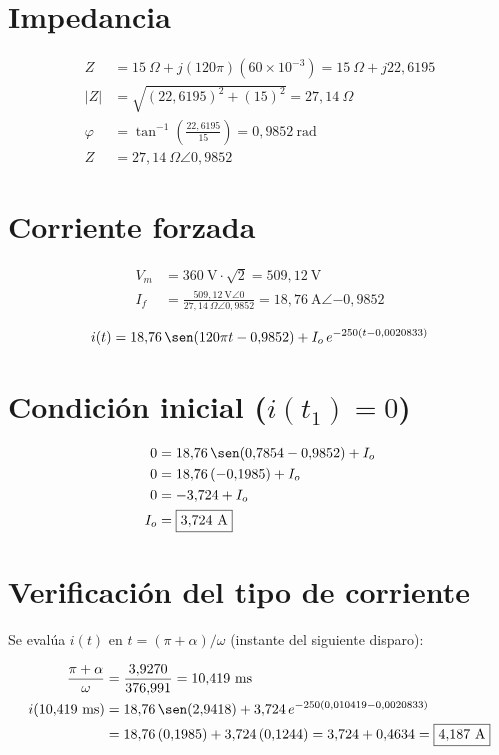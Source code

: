 \documentclass[11pt]{article}
\begin{document}
\section*{Impedancia}

\begin{align*}
Z &= 15\ \Omega + j(120\pi)(60\times10^{-3}) = 15\ \Omega + j22{,}6195 \\
|Z| &= \sqrt{(22{,}6195)^2+(15)^2} = 27{,}14\ \Omega \\
\varphi &= \tan^{-1}\!\left(\frac{22{,}6195}{15}\right) = 0{,}9852\ \text{rad} \\
Z &= 27{,}14\ \Omega \angle 0{,}9852
\end{align*}

\section*{Corriente forzada}

\begin{align*}
V_m &= 360\ \text{V}\cdot\sqrt{2} = 509{,}12\ \text{V} \\
I_f &= \frac{509{,}12\ \text{V}\angle 0}{27{,}14\ \Omega\angle 0{,}9852} = 18{,}76\ \text{A}\angle{-0{,}9852}
\end{align*}

\begin{align*}
i(t) = 18{,}76\,\sen(120\pi t - 0{,}9852) + I_o\,e^{-250(t-0{,}0020833)}
\end{align*}

\section*{Condici\'on inicial ($i(t_1)=0$)}

\begin{align*}
0 &= 18{,}76\,\sen(0{,}7854 - 0{,}9852) + I_o \\
0 &= 18{,}76\,(-0{,}1985) + I_o \\
0 &= -3{,}724 + I_o \\
I_o &= \boxed{3{,}724\ \text{A}}
\end{align*}

\section*{Verificaci\'on del tipo de corriente}

Se eval\'ua $i(t)$ en $t=(\pi+\alpha)/\omega$ (instante del siguiente disparo):

\begin{align*}
\frac{\pi+\alpha}{\omega} &= \frac{3{,}9270}{376{,}991} = 10{,}419\ \text{ms} \\
i(10{,}419\ \text{ms}) &= 18{,}76\,\sen(2{,}9418) + 3{,}724\,e^{-250(0{,}010419-0{,}0020833)} \\
&= 18{,}76\,(0{,}1985) + 3{,}724\,(0{,}1244) = 3{,}724 + 0{,}4634 = \boxed{4{,}187\ \text{A}}
\end{align*}
\end{document}
